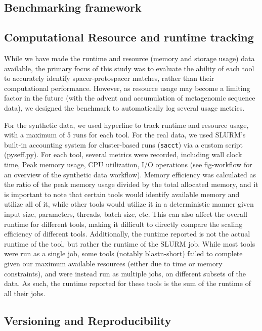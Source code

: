 \documentclass[
]{article}
\begin{document}
\subsection{Benchmarking framework}\label{sec-benchmark}

\subsection{Computational Resource and runtime
tracking}\label{sec-resource-tracking}

While we have made the runtime and resource (memory and storage usage)
data available, the primary focus of this study was to evaluate the
ability of each tool to accurately identify spacer-protospacer matches,
rather than their computational performance. However, as resource usage
may become a limiting factor in the future (with the advent and
accumulation of metagenomic sequence data), we designed the benchmark to
automatically log several usage metrics.

For the synthetic data, we used hyperfine
\autocite{Peter_hyperfine_2023} to track runtime and resource usage,
with a maximum of 5 runs for each tool. For the real data, we used
SLURM's built-in accounting system for cluster-based runs
(\texttt{sacct}) via a custom script (pyseff.py)\autocite{pyseff}. For
each tool, several metrics were recorded, including wall clock time,
Peak memory usage, CPU utilization, I/O operations (see fig-workflow for
an overview of the synthetic data workflow). Memory efficiency was
calculated as the ratio of the peak memory usage divided by the total
allocated memory, and it is important to note that certain tools would
identify available memory and utilize all of it, while other tools would
utilize it in a deterministic manner given input size, parameters,
threads, batch size, etc. This can also affect the overall runtime for
different tools, making it difficult to directly compare the scaling
efficiency of different tools. Additionally, the runtime reported is not
the actual runtime of the tool, but rather the runtime of the SLURM job.
While most tools were run as a single job, some tools (notably
blastn-short) failed to complete given our maximum available resources
(either due to time or memory constraints), and were instead run as
multiple jobs, on different subsets of the data. As such, the runtime
reported for these tools is the sum of the runtime of all their jobs.

\subsection{Versioning and Reproducibility}\label{sec-reproducibility}
\end{document}
